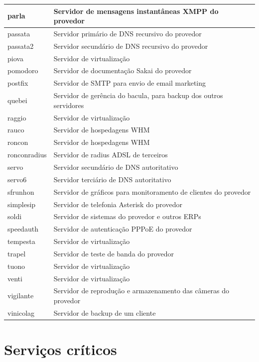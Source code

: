 \begin{table}
\begin{center}
\begin{tabular}{|l|p{12cm}|}
parla & Servidor de mensagens instantâneas XMPP do provedor\\\hline
passata & Servidor primário de DNS recursivo do provedor\\\hline
passata2 & Servidor secundário de DNS recursivo do provedor\\\hline
piova & Servidor de virtualização\\\hline
pomodoro & Servidor de documentação Sakai do provedor\\\hline
postfix & Servidor de SMTP para envio de email marketing\\\hline
quebei & Servidor de gerência do bacula, para backup dos outros servidores\\\hline
raggio & Servidor de virtualização\\\hline
rauco & Servidor de hospedagens WHM\\\hline
roncon & Servidor de hospedagens WHM\\\hline
ronconradius & Servidor de radius ADSL de terceiros\\\hline
servo & Servidor secundário de DNS autoritativo\\\hline
servo6 & Servidor terciário de DNS autoritativo\\\hline
sfrunhon & Servidor de gráficos para monitoramento de clientes do provedor\\\hline
simplesip & Servidor de telefonia Asterisk do provedor\\\hline
soldi & Servidor de sistemas do provedor e outros ERPs\\\hline
speedauth & Servidor de autenticação PPPoE do provedor\\\hline
tempesta & Servidor de virtualização\\\hline
trapel & Servidor de teste de banda do provedor\\\hline
tuono & Servidor de virtualização\\\hline
venti & Servidor de virtualização\\\hline
vigilante & Servidor de reprodução e armazenamento das câmeras do provedor\\\hline
vinicolag & Servidor de backup de um cliente\\\hline
\end{tabular}
\end{center}
\end{table}


\section{Serviços críticos}
\label{section:servcrit}


